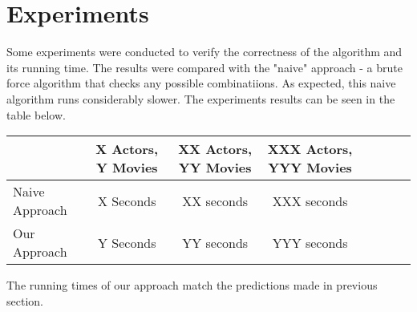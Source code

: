 \label{Experiments}
\section{Experiments}


Some experiments were conducted to verify the correctness of the algorithm and its running time. The results were compared with the "naive" approach - a brute force algorithm that checks any possible combinatiions. As expected, this naive algorithm runs considerably slower. The experiments results can be seen in the table below.

\begin{tabular}{l*{6}{c}r}
               & X Actors, Y Movies & XX Actors, YY Movies & XXX Actors, YYY Movies \\
\hline
Naive Approach & X Seconds & XX seconds & XXX seconds\\
Our Approach   & Y Seconds & YY seconds & YYY seconds\\
\end{tabular}

The running times of our approach match the predictions made in previous section.